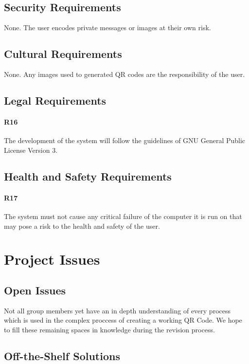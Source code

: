 \documentclass[12pt, titlepage]{article}
\begin{document}
\subsection{Security Requirements}

	None. The user encodes private messages or images at their own risk.

\subsection{Cultural Requirements}

	None. Any images used to generated QR codes are the responsibility of the 
	user.

\subsection{Legal Requirements}

	\paragraph{R16}
	The development of the system will follow the guidelines of GNU General 
	Public License Version 3.

\subsection{Health and Safety Requirements}

	\paragraph{R17}
	The system must not cause any critical failure of the computer it is run on 
	that may pose a risk to the health and safety of the user.

\section{Project Issues}

\subsection{Open Issues}

	Not all group members yet have an in depth understanding of every process which
	is used in the complex proccess of creating a working QR Code. We hope to 
	fill these remaining spaces in knowledge during the revision process.

\subsection{Off-the-Shelf Solutions}
\end{document}
